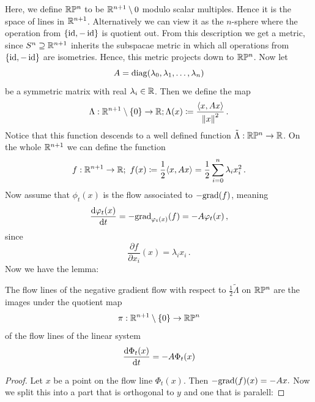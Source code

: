 		
		
		\begin{example}
		Here, we define $\mathbb{R}\mathbb{P}^n$ to be $\mathbb{R}^{n+1}\setminus 0$ modulo scalar multiples. Hence it is the space of lines in $\mathbb{R}^{n+1}$. Alternatively we can view it as the $n$-sphere where the operation from $\{\operatorname{\mathrm{id}},-\operatorname{\mathrm{id}}\}$ is quotient out. From this description we get a metric, since $S^n\supseteq \mathbb{R}^{n+1}$ inherits the subspacae metric in which all operations from $\{\operatorname{\mathrm{id}},-\operatorname{\mathrm{id}}\}$ are isometries. Hence, this metric projects down to $\mathbb{R}\mathbb{P}^n$. Now let
		\begin{equation*}
			A=\mathrm{diag}(\lambda_0,\lambda_1,\dots,\lambda_n)
		\end{equation*}be a symmetric matrix with real $\lambda_i\in \mathbb{R}$. Then we define the map
		\begin{equation*}
			\Lambda:\mathbb{R}^{n+1}\setminus\{0\}\to \mathbb{R}; \Lambda(x)\coloneq \frac{\langle x,Ax\rangle}{\left\lVert x\right\rVert^2}\,.
		\end{equation*}Notice that this function descends to a well defined function $\tilde{\Lambda}:\mathbb{R}\mathbb{P}^n\to \mathbb{R}$. On the whole $\mathbb{R}^{n+1}$ we can define the function
		\begin{equation*}
			f:\mathbb{R}^{n+1}\to \mathbb{R};~f(x)\coloneq \frac{1}{2}\langle x,Ax\rangle=\frac{1}{2}\sum_{i=0}^n\lambda_i x_i^2\,.
		\end{equation*} Now assume that $\phi_t(x)$ is the flow associated to $- \mathrm{grad}(f)$, meaning
		\begin{equation*}
			\frac{\mathop{}\!\mathrm{d} \varphi_t(x)}{\mathop{}\!\mathrm{d} t}=-\mathrm{grad}_{\varphi_t(x)}(f)=-A\varphi_t(x)\,,
		\end{equation*} since 
		\begin{equation*}
			\frac{\partial f}{\partial x_i}(x)=\lambda_ix_i\,.
		\end{equation*}
		Now we have the lemma: 
		\begin{lemma}
			The flow lines of the negative gradient flow with respect to $\frac{1}{2}\tilde{\Lambda}$ on $\mathbb{R}\mathbb{P}^n$ are the images under the quotient map 
			\begin{equation*}
				\pi: \mathbb{R}^{n+1}\setminus \{0\}\to \mathbb{R}\mathbb{P}^n
			\end{equation*}of the flow lines of the linear system
			\begin{equation*}
				\frac{\mathop{}\!\mathrm{d} \Phi_t(x)}{\mathop{}\!\mathrm{d} t}=-A \Phi_t(x)
			\end{equation*}
		\end{lemma}
		\begin{proof}
		Let $x$ be a point on the flow line $\Phi_t(x)$. Then $-\mathrm{grad}(f)(x)=-Ax.$ Now we split this into a part that is orthogonal to $y$ and one that is paralell:

\end{proof}
\end{example}

